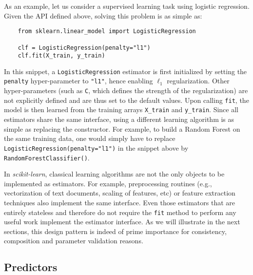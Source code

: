 \documentclass{llncs}
\newcommand{\sklearn}{\textit{scikit-learn}\xspace}
\begin{document}
As an example, let us consider a supervised learning task using logistic regression.
Given the API defined above, solving this problem is as simple as:
\begin{verbatim}
    from sklearn.linear_model import LogisticRegression

    clf = LogisticRegression(penalty="l1")
    clf.fit(X_train, y_train)
\end{verbatim}
In this snippet, a \texttt{LogisticRegression} estimator is first initialized by
setting the \texttt{penalty} hyper-parameter to \texttt{"l1"}, hence enabling
$\ell_1$ regularization. Other hyper-parameters (such as \texttt{C}, which
defines the strength of the regularization) are not explicitly defined and are
thus set to the default values. Upon calling \texttt{fit}, the model is then
learned from the training arrays \texttt{X\_train} and \texttt{y\_train}. Since
all estimators share the same interface, using a different learning algorithm is
as simple as replacing the constructor. For example, to build a Random Forest on
the same training data, one would simply have to replace
\texttt{LogisticRegression(penalty="l1")} in the snippet above by \\
\texttt{RandomForestClassifier()}.

In \sklearn, classical learning algorithms are not the only objects
to be implemented as estimators. For example, preprocessing routines (e.g.,
vectorization of text documents, scaling of features, etc) or feature
extraction techniques also implement the same interface. Even those estimators
that are entirely stateless and therefore do not require the \texttt{fit} method
to perform any useful work implement the estimator interface. As we will
illustrate in the next sections, this design pattern is indeed of prime
importance for consistency, composition and parameter validation reasons.

\subsection{Predictors}
\end{document}
